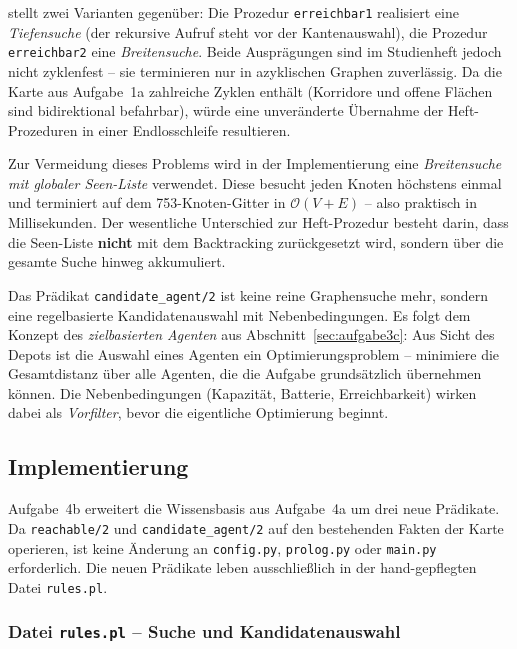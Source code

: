 \textcite[S. 70\,f.]{4} stellt zwei Varianten gegenüber: Die Prozedur \texttt{erreichbar1} realisiert eine \textit{Tiefensuche} (der rekursive Aufruf steht vor der Kantenauswahl), die Prozedur \texttt{erreichbar2} eine \textit{Breitensuche}. Beide Ausprägungen sind im Studienheft jedoch nicht zyklenfest -- sie terminieren nur in azyklischen Graphen zuverlässig. Da die Karte aus Aufgabe~1a zahlreiche Zyklen enthält (Korridore und offene Flächen sind bidirektional befahrbar), würde eine unveränderte Übernahme der Heft-Prozeduren in einer Endlosschleife resultieren.

Zur Vermeidung dieses Problems wird in der Implementierung eine \textit{Breitensuche mit globaler Seen-Liste} verwendet. Diese besucht jeden Knoten höchstens einmal und terminiert auf dem 753-Knoten-Gitter in \(\mathcal{O}(V + E)\) -- also praktisch in Millisekunden. Der wesentliche Unterschied zur Heft-Prozedur besteht darin, dass die Seen-Liste \textbf{nicht} mit dem Backtracking zurückgesetzt wird, sondern über die gesamte Suche hinweg akkumuliert.

Das Prädikat \texttt{candidate\_agent/2} ist keine reine Graphensuche mehr, sondern eine regelbasierte Kandidatenauswahl mit Nebenbedingungen. Es folgt dem Konzept des \textit{zielbasierten Agenten} aus Abschnitt~\ref{sec:aufgabe3c}: Aus Sicht des Depots ist die Auswahl eines Agenten ein Optimierungsproblem -- minimiere die Gesamtdistanz über alle Agenten, die die Aufgabe grundsätzlich übernehmen können. Die Nebenbedingungen (Kapazität, Batterie, Erreichbarkeit) wirken dabei als \textit{Vorfilter}, bevor die eigentliche Optimierung beginnt.

\subsection{Implementierung}

Aufgabe~4b erweitert die Wissensbasis aus Aufgabe~4a um drei neue Prädikate. Da \texttt{reachable/2} und \texttt{candidate\_agent/2} auf den bestehenden Fakten der Karte operieren, ist keine Änderung an \texttt{config.py}, \texttt{prolog.py} oder \texttt{main.py} erforderlich. Die neuen Prädikate leben ausschließlich in der hand-gepflegten Datei \texttt{rules.pl}.


\subsubsection{Datei \texttt{rules.pl} – Suche und Kandidatenauswahl}

